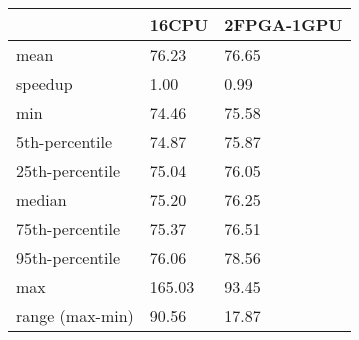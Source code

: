 \begin{tabular}{lll}
\toprule
 & 16CPU & 2FPGA-1GPU \\
\midrule
mean & 76.23 & 76.65 \\
speedup & 1.00 & 0.99 \\
min & 74.46 & 75.58 \\
5th-percentile & 74.87 & 75.87 \\
25th-percentile & 75.04 & 76.05 \\
median & 75.20 & 76.25 \\
75th-percentile & 75.37 & 76.51 \\
95th-percentile & 76.06 & 78.56 \\
max & 165.03 & 93.45 \\
range (max-min) & 90.56 & 17.87 \\
\bottomrule
\end{tabular}

